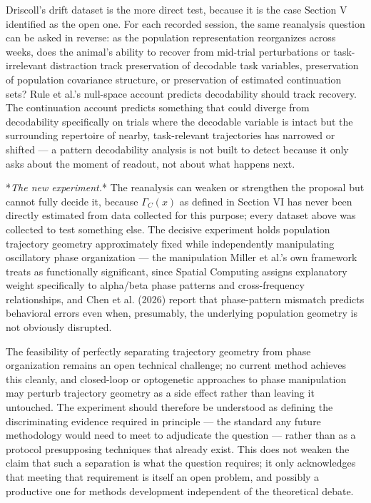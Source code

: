 \documentclass[11pt]{article}
\begin{document}
Driscoll's drift dataset is the more direct test, because it is the case Section V identified as the open one. For each recorded session, the same reanalysis question can be asked in reverse: as the population representation reorganizes across weeks, does the animal's ability to recover from mid-trial perturbations or task-irrelevant distraction track preservation of decodable task variables, preservation of population covariance structure, or preservation of estimated continuation sets? Rule et al.'s null-space account predicts decodability should track recovery. The continuation account predicts something that could diverge from decodability specifically on trials where the decodable variable is intact but the surrounding repertoire of nearby, task-relevant trajectories has narrowed or shifted — a pattern decodability analysis is not built to detect because it only asks about the moment of readout, not about what happens next.

*\textit{The new experiment.}* The reanalysis can weaken or strengthen the proposal but cannot fully decide it, because $\Gamma_C(x)$ as defined in Section VI has never been directly estimated from data collected for this purpose; every dataset above was collected to test something else. The decisive experiment holds population trajectory geometry approximately fixed while independently manipulating oscillatory phase organization — the manipulation Miller et al.'s own framework treats as functionally significant, since Spatial Computing assigns explanatory weight specifically to alpha/beta phase patterns and cross-frequency relationships, and Chen et al. (2026) report that phase-pattern mismatch predicts behavioral errors even when, presumably, the underlying population geometry is not obviously disrupted.

The feasibility of perfectly separating trajectory geometry from phase organization remains an open technical challenge; no current method achieves this cleanly, and closed-loop or optogenetic approaches to phase manipulation may perturb trajectory geometry as a side effect rather than leaving it untouched. The experiment should therefore be understood as defining the discriminating evidence required in principle — the standard any future methodology would need to meet to adjudicate the question — rather than as a protocol presupposing techniques that already exist. This does not weaken the claim that such a separation is what the question requires; it only acknowledges that meeting that requirement is itself an open problem, and possibly a productive one for methods development independent of the theoretical debate.
\end{document}
